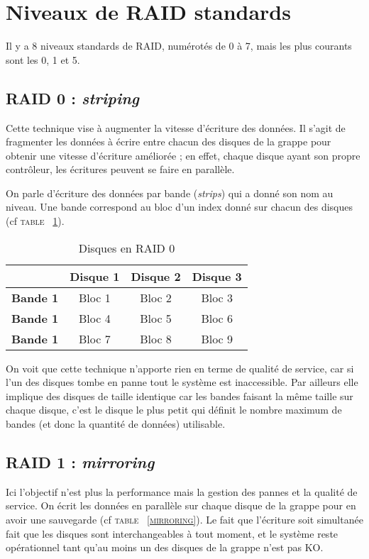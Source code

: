 \section{Niveaux de RAID standards}
Il y a 8 niveaux standards de RAID, numérotés de 0 à 7, mais les plus courants sont les 0, 1 et 5. 

\subsection{RAID 0 : \textit{striping}}
Cette technique vise à augmenter la vitesse d'écriture des données. Il s'agit de fragmenter les données à écrire entre chacun des disques de la grappe pour obtenir une vitesse d'écriture améliorée ; en effet, chaque disque ayant son propre contrôleur, les écritures peuvent se faire en parallèle. 

On parle d'écriture des données par bande (\textit{strips}) qui a donné son nom au niveau. Une bande correspond au bloc d'un index donné sur chacun des disques (cf \textsc{table ~\ref{striping}}).

\begin{table}[h]
    \centering
    \caption{\label{striping} Disques en RAID 0}
    \begin{tabular}{|c|c|c|c|}
        \hline
         & \textbf{Disque 1} & \textbf{Disque 2} & \textbf{Disque 3} \\
        \hline
        \textbf{Bande 1} & Bloc 1 & Bloc 2 & Bloc 3 \\
        \hline
        \textbf{Bande 1} & Bloc 4 & Bloc 5 & Bloc 6 \\
        \hline
        \textbf{Bande 1} & Bloc 7 & Bloc 8 & Bloc 9 \\
        \hline
    \end{tabular}
\end{table}

On voit que cette technique n'apporte rien en terme de qualité de service, car si l'un des disques tombe en panne tout le système est inaccessible. Par ailleurs elle implique des disques de taille identique car les bandes faisant la même taille sur chaque disque, c'est le disque le plus petit qui définit le nombre maximum de bandes (et donc la quantité de données) utilisable. 

\subsection{RAID 1 : \textit{mirroring}}
Ici l'objectif n'est plus la performance mais la gestion des pannes et la qualité de service. On écrit les données en parallèle sur chaque disque de la grappe pour en avoir une sauvegarde (cf \textsc{table ~\ref{mirroring}}). Le fait que l'écriture soit simultanée fait que les disques sont interchangeables à tout moment, et le système reste opérationnel tant qu'au moins un des disques de la grappe n'est pas KO. 

